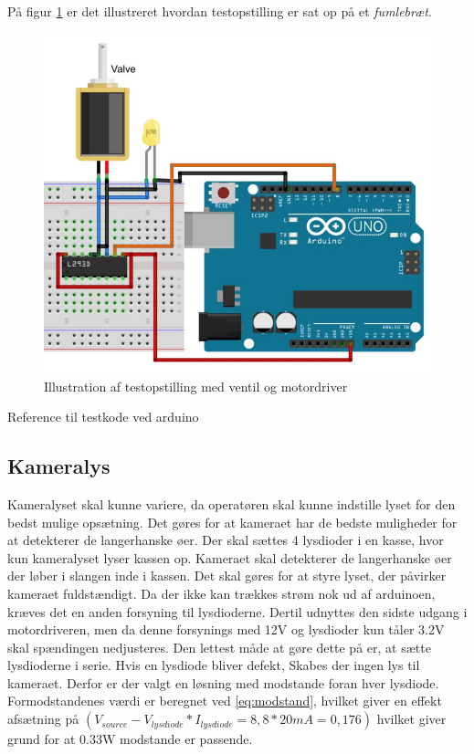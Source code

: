 På figur \ref{fig:ventilbreadboard} er det illustreret hvordan testopstilling er sat op på et \textit{fumlebræt}.

\begin{figure}[H]
	\centering
	\includegraphics[width=1\textwidth]{billeder/Hardware/diagrammer/Ventilbreadboard.JPG}
	\caption{Illustration af testopstilling med ventil og motordriver}
	\label{fig:ventilbreadboard}
\end{figure} 
 
Reference til testkode ved arduino 
 
 \subsection{Kameralys}
 Kameralyset skal kunne variere, da operatøren skal kunne indstille lyset for den bedst mulige opsætning. Det gøres for at kameraet har de bedste muligheder for at detekterer de langerhanske øer. Der skal sættes 4 lysdioder i en kasse, hvor kun kameralyset lyser kassen op. Kameraet skal detekterer de langerhanske øer der løber i slangen inde i kassen. Det skal gøres for at styre lyset, der påvirker kameraet fuldstændigt. Da der ikke kan trækkes strøm nok ud af arduinoen, kræves det en anden forsyning til lysdioderne. Dertil udnyttes den sidste udgang i motordriveren, men da denne forsynings med 12V og lysdioder kun tåler 3.2V skal spændingen nedjusteres. Den lettest måde at gøre dette på er, at sætte lysdioderne i serie. Hvis en lysdiode bliver defekt, Skabes der ingen lys til kameraet. Derfor er der valgt en løsning med modstande foran hver lysdiode. Formodstandenes værdi er beregnet ved \ref{eq:modstand}, hvilket giver en effekt afsætning på $(V_{source}-V_{lysdiode}*I_{lysdiode}=8,8*20mA=0,176)$ hvilket giver grund for at 0.33W modstande er passende.

